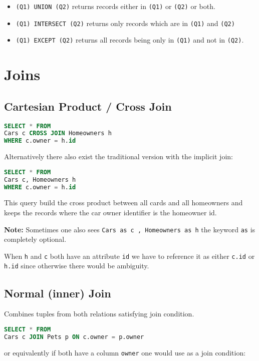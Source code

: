 \documentclass{sciposter}
\renewcommand{\t}[1]{\texttt{#1}}
\begin{document}
\begin{multicols}{3}
\begin{itemize}
	\item \t{(Q1) UNION (Q2)} returns records either in \t{(Q1)} or \t{(Q2)} or both.
	\item \t{(Q1) INTERSECT (Q2)} returns only records which are in \t{(Q1)} and \t{(Q2)}
	\item \t{(Q1) EXCEPT (Q2)} returns all records being only in \t{(Q1)} and not in \t{(Q2)}.
\end{itemize}

\section*{Joins}

\subsection*{Cartesian Product / Cross Join}

\begin{lstlisting}[language=SQL]
SELECT * FROM 
Cars c CROSS JOIN Homeowners h
WHERE c.owner = h.id
\end{lstlisting}

Alternatively there also exist the traditional version with the implicit join:

\begin{lstlisting}[language=SQL]
SELECT * FROM 
Cars c, Homeowners h
WHERE c.owner = h.id
\end{lstlisting}

This query build the cross product between all cards and all homeowners and keeps the records where the car owner identifier is the homeowner id.

\textbf{Note:} Sometimes one also sees \t{Cars as c , Homeowners as h} the keyword \t{as} is completely optional.


When \t{h} and \t{c} both have an attribute \t{id} we have to reference it as either \t{c.id} or \t{h.id} since otherwise there would be ambiguity.

\subsection*{Normal (inner) Join}
Combines tuples from both relations satisfying join condition.
\begin{lstlisting}[language=SQL]
SELECT * FROM 
Cars c JOIN Pets p ON c.owner = p.owner
\end{lstlisting}

or equivalently if both have a column \t{owner} one would use as a join condition:


\end{multicols}
\end{document}

